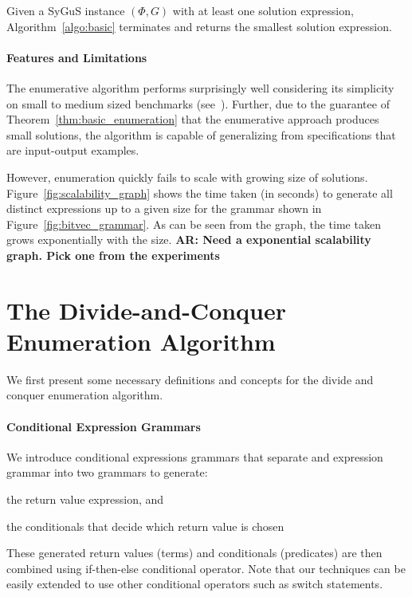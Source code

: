 \documentclass{llncs}
\newcommand\arsays[1]{{\bf AR: #1}}
\newcommand\Spec{\Phi}
\newcommand\Grammar{G}
\begin{document}
\begin{theorem}
  \label{thm:basic_enumeration}
  Given a SyGuS instance $(\Spec, \Grammar)$ with at least one solution
  expression, Algorithm~\ref{algo:basic} terminates and returns the
  smallest solution expression.
\end{theorem}

\paragraph{Features and Limitations}
The enumerative algorithm performs surprisingly well considering its
simplicity on small to medium sized benchmarks
(see~\cite{Transit,sygus_reports,etc}).
Further, due to the guarantee of Theorem~\ref{thm:basic_enumeration}
that the enumerative approach produces small solutions, the algorithm is
capable of generalizing from specifications that are input-output
examples.

However, enumeration quickly fails to scale with growing size of
solutions.
Figure~\ref{fig:scalability_graph} shows the time taken (in seconds) to
generate all distinct expressions up to a given size for the grammar
shown in Figure~\ref{fig:bitvec_grammar}.
As can be seen from the graph, the time taken grows exponentially with
the size.
\arsays{Need a exponential scalability graph. Pick one from the
experiments}



\section{The Divide-and-Conquer Enumeration Algorithm}
\label{sec:algo}

We first present some necessary definitions and concepts for the divide
and conquer enumeration algorithm.

\paragraph{Conditional Expression Grammars}
We introduce conditional expressions grammars that separate and
expression grammar into two grammars to generate:
\begin{inparaenum}[(a)]
\item the return value expression, and
\item the conditionals that decide which return value is chosen
\end{inparaenum}
These generated return values (terms) and conditionals (predicates) are
then combined using if-then-else conditional operator.
Note that our techniques can be easily extended to use other conditional
operators such as switch statements.
\end{document}
